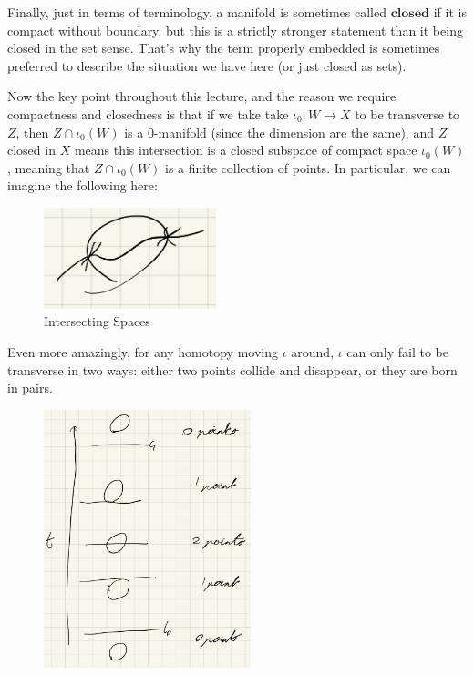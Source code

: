 \documentclass{article}
\theoremstyle{definition}
\begin{document}
Finally, just in terms of terminology, a manifold is sometimes called
$\textbf{closed}$ if it is compact without boundary, but this is a strictly
stronger statement than it being closed in the set sense. That's why the term
properly embedded is sometimes preferred to describe the situation we have here
(or just closed as sets).

Now the key point throughout this
lecture, and the reason we require compactness and closedness is that if we take
take $\iota_0 : W \to X$ to be transverse to $Z$, then $Z \cap \iota_0 (W)$ is a
0-manifold (since the dimension are the same), and $Z$ closed in $X$ means this
intersection is a closed subspace of compact space $\iota_0(W)$, meaning that $Z
\cap \iota_0(W)$ is a finite collection of points. In particular, we can imagine
the following here:

\begin{figure}[H]
  \centering
  \includegraphics[width=5cm]{res/DG/DG14_intersecting_spaces.jpg}
  \caption{Intersecting Spaces}
  \label{DG14_interesecting_spaces.jpg}
\end{figure}

Even more amazingly, for any homotopy moving $\iota$ around, $\iota$ can only
fail to be transverse in two ways: either two points collide and disappear, or
they are born in pairs.

\begin{figure}[H]
  \centering
  \includegraphics[width=6cm]{res/DG/DG14_moving_line.jpg}
  \label{DG14_moving_line.jpg}
\end{figure}
\end{document}
